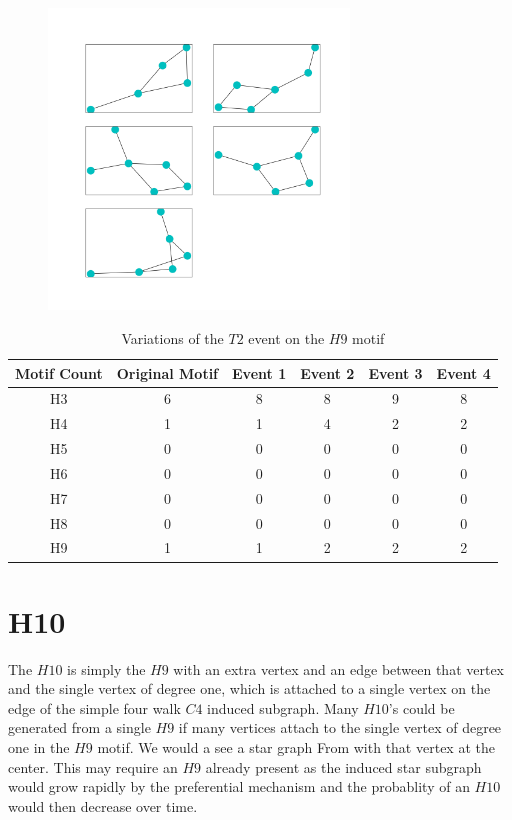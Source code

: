 \begin{figure}[!ht]
    \includegraphics[width=8cm]{Images/H9_evolution.png}
    \centering
\end{figure}

\begin{table}
    \centering
    \begin{tabular}{||c c c c c c ||} 
    \hline
    Motif Count & Original Motif & Event 1 & Event 2 & Event 3  & Event 4\\ [0.5ex] 
    \hline\hline
    H3 & 6 & 8 & 8 & 9 & 8\\ 
    \hline
    H4 & 1 & 1 & 4 & 2 & 2 \\
    \hline
    H5 & 0 & 0 & 0 & 0 & 0\\
    \hline
    H6 & 0 & 0 & 0 & 0 & 0\\
    \hline
    H7 & 0 & 0 & 0 & 0 & 0\\
    \hline
    H8 & 0 & 0 & 0 & 0& 0\\
    \hline
    H9 & 1 & 1 & 2 & 2 &2\\
    \hline
   \end{tabular}
   \caption{Variations of the $T2$ event on the $H9$ motif}
   \label{table:7}
\end{table}

\section{H10}
The $H10$ is simply the $H9$ with an extra vertex and an edge between that vertex and the 
single vertex of degree one, which is attached to a single vertex on the edge of the simple
four walk $C4$ induced subgraph. Many $H10$'s could be generated from a single $H9$ if many vertices
attach to the single vertex of degree one in the $H9$ motif. We would a see a star graph From
with that vertex at the center. This may require an $H9$ already present as the induced star subgraph
would grow rapidly by the preferential mechanism and the probablity of an $H10$ would then decrease over
time.

